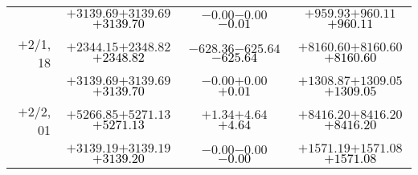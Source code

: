 \documentclass[compress]{beamer}
\begin{document}
\begin{frame}
{\begin{tabular}{r | c | c | c}
           & $+3139.69$\hspace{0.1 cm}$+3139.69$\hspace{0.1 cm}\textcolor{black}{$+3139.70$} & $-0.00$\hspace{0.1 cm}$-0.00$\hspace{0.1 cm}\textcolor{black}{$-0.01$} & $+959.93$\hspace{0.1 cm}$+960.11$\hspace{0.1 cm}\textcolor{black}{$+960.11$} \\
$+$2/1, 18 & $+2344.15$\hspace{0.1 cm}$+2348.82$\hspace{0.1 cm}\textcolor{black}{$+2348.82$} & $-628.36$\hspace{0.1 cm}$-625.64$\hspace{0.1 cm}\textcolor{black}{$-625.64$} & $+8160.60$\hspace{0.1 cm}$+8160.60$\hspace{0.1 cm}\textcolor{black}{$+8160.60$} \\
           & $+3139.69$\hspace{0.1 cm}$+3139.69$\hspace{0.1 cm}\textcolor{black}{$+3139.70$} & $-0.00$\hspace{0.1 cm}$+0.00$\hspace{0.1 cm}\textcolor{black}{$+0.01$} & $+1308.87$\hspace{0.1 cm}$+1309.05$\hspace{0.1 cm}\textcolor{black}{$+1309.05$} \\
$+$2/2, 01 & $+5266.85$\hspace{0.1 cm}$+5271.13$\hspace{0.1 cm}\textcolor{black}{$+5271.13$} & $+1.34$\hspace{0.1 cm}$+4.64$\hspace{0.1 cm}\textcolor{black}{$+4.64$} & $+8416.20$\hspace{0.1 cm}$+8416.20$\hspace{0.1 cm}\textcolor{black}{$+8416.20$} \\
           & $+3139.19$\hspace{0.1 cm}$+3139.19$\hspace{0.1 cm}\textcolor{black}{$+3139.20$} & $-0.00$\hspace{0.1 cm}$-0.00$\hspace{0.1 cm}\textcolor{black}{$-0.00$} & $+1571.19$\hspace{0.1 cm}$+1571.08$\hspace{0.1 cm}\textcolor{black}{$+1571.08$} \\

\end{tabular}}
\end{frame}
\end{document}
